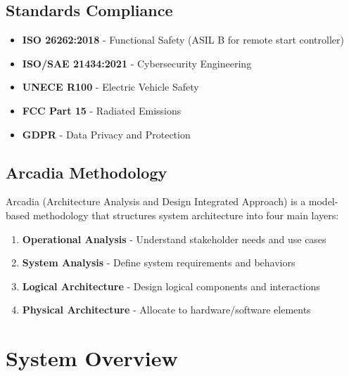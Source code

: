\documentclass[11pt,a4paper]{article}
\begin{document}
\subsection{Standards Compliance}
\begin{tcolorbox}[colback=arcblue!5,colframe=arcblue,title=Safety \& Security Standards]
\begin{itemize}[leftmargin=*]
    \item \textbf{ISO 26262:2018} - Functional Safety (ASIL B for remote start controller)
    \item \textbf{ISO/SAE 21434:2021} - Cybersecurity Engineering
    \item \textbf{UNECE R100} - Electric Vehicle Safety
    \item \textbf{FCC Part 15} - Radiated Emissions
    \item \textbf{GDPR} - Data Privacy and Protection
\end{itemize}
\end{tcolorbox}

\subsection{Arcadia Methodology}
Arcadia (Architecture Analysis and Design Integrated Approach) is a model-based methodology that structures system architecture into four main layers:

\begin{enumerate}[leftmargin=*]
    \item \textbf{Operational Analysis} - Understand stakeholder needs and use cases
    \item \textbf{System Analysis} - Define system requirements and behaviors
    \item \textbf{Logical Architecture} - Design logical components and interactions
    \item \textbf{Physical Architecture} - Allocate to hardware/software elements
\end{enumerate}

\section{System Overview}
\end{document}
